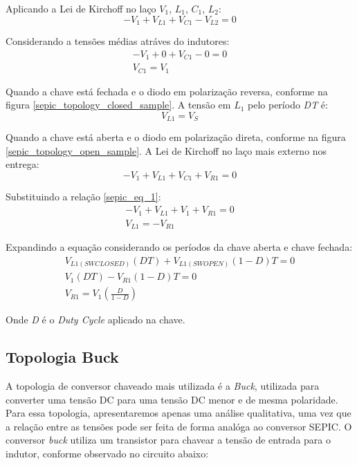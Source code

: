 Aplicando a Lei de Kirchoff no laço $V_{1}$, $L_{1}$, $C_{1}$, $L_{2}$:
\begin{equation}
    - V_{1} + V_{L1} + V_{C1} - V_{L2} = 0
\end{equation}

Considerando a tensões médias atráves do indutores:
\begin{equation}
    \begin{split}
        - V_{1} + 0 + V_{C1} - 0 = 0 \\ V_{C1} = V_{1}
    \end{split}
    \label{sepic_eq_1}
\end{equation}

Quando a chave está fechada e o diodo em polarização reversa, conforme na figura \ref{sepic_topology_closed_sample}. A tensão em $L_{1}$ pelo período \textit{DT} é:
\begin{equation}
    V_{L1} = V_{S}
\end{equation}

Quando a chave está aberta e o diodo em polarização direta, conforme na figura \ref{sepic_topology_open_sample}. A Lei de Kirchoff no laço mais externo nos entrega:
\begin{equation}
    -V_{1} + V_{L1} + V_{C1} + V_{R1} = 0
\end{equation}

Substituindo a relação \ref{sepic_eq_1}:
\begin{equation}
    \begin{split}
        -V_{1} + V_{L1} + V_{1} + V_{R1} = 0 \\
        V_{L1} = - V_{R1}
    \end{split}
    \label{sepic_eq_2}
\end{equation}

Expandindo a equação considerando os períodos da chave aberta e chave fechada:
\begin{equation}
    \begin{split}
        V_{L1 (SW CLOSED)} (DT) + V_{L1 (SW OPEN)} (1-D)T = 0\\
        V_{1}(DT) - V_{R1}(1-D)T = 0\\
        V_{R1} = V_{1} (\frac{D}{1-D})
    \end{split}
\end{equation}

Onde \textit{D} é o \textit{Duty Cycle} aplicado na chave.

\subsection*{Topologia Buck}
A topologia de conversor chaveado mais utilizada é a \textit{Buck}, utilizada para converter uma tensão DC para uma tensão DC menor e de mesma polaridade. Para essa topologia, apresentaremos apenas uma análise qualitativa, uma vez que a relação entre as tensões pode ser feita de forma analóga ao conversor SEPIC. O conversor \textit{buck} utiliza um transistor para chavear a tensão de entrada para o indutor, conforme observado no circuito abaixo:


